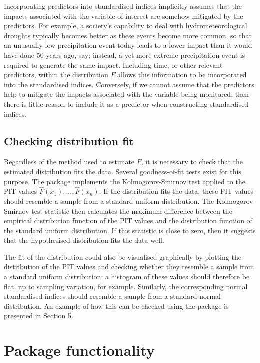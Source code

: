 Incorporating predictors into standardised indices implicitly assumes that the impacts associated with the variable of interest are somehow mitigated by the predictors. For example, a society's capability to deal with hydrometeorological droughts typically becomes better as these events become more common, so that an unusually low precipitation event today leads to a lower impact than it would have done 50 years ago, say; instead, a yet more extreme precipitation event is required to generate the same impact. Including time, or other relevant predictors, within the distribution \(F\) allows this information to be incorporated into the standardised indices. Conversely, if we cannot assume that the predictors help to mitigate the impacts associated with the variable being monitored, then there is little reason to include it as a predictor when constructing standardised indices.

\hypertarget{checking-distribution-fit}{%
\subsection{Checking distribution fit}\label{checking-distribution-fit}}

Regardless of the method used to estimate \(F\), it is necessary to check that the estimated distribution fits the data. Several goodness-of-fit tests exist for this purpose. The  package implements the Kolmogorov-Smirnov test \citep{Massey1951} applied to the PIT values \(\hat{F}(x_{1}), \dots, \hat{F}(x_{n})\). If the distribution fits the data, these PIT values should resemble a sample from a standard uniform distribution. The Kolmogorov-Smirnov test statistic then calculates the maximum difference between the empirical distribution function of the PIT values and the distribution function of the standard uniform distribution. If this statistic is close to zero, then it suggests that the hypothesised distribution fits the data well.

The fit of the distribution could also be visualised graphically by plotting the distribution of the PIT values and checking whether they resemble a sample from a standard uniform distribution; a histogram of these values should therefore be flat, up to sampling variation, for example. Similarly, the corresponding normal standardised indices should resemble a sample from a standard normal distribution. An example of how this can be checked using the  package is presented in Section 5.

\hypertarget{package-functionality}{%
\section{Package functionality}\label{package-functionality}}

